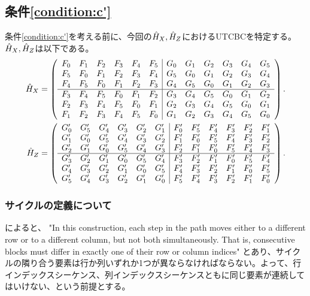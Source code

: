 \documentclass[a4paper,11pt,dvipdfmx]{jsarticle}
\theoremstyle{definition}
\begin{document}
\subsection{条件\ref{condition:c'}}
条件\ref{condition:c'}を考える前に、今回の$\hat{H}_X,\hat{H}_Z$におけるUTCBCを特定する。
$\hat{H}_X,\hat{H}_Z$は以下である。
\begin{align}
  \hat{H}_X &= \left( \begin{array}{cccccc|cccccc}
  F_0 & F_1 & F_2 & F_3 & F_4 & F_5 & G_0 & G_1 & G_2 & G_3 & G_4 & G_5 \\
  F_5 & F_0 & F_1 & F_2 & F_3 & F_4 & G_5 & G_0 & G_1 & G_2 & G_3 & G_4 \\
  F_4 & F_5 & F_0 & F_1 & F_2 & F_3 & G_4 & G_5 & G_0 & G_1 & G_2 & G_3 \\ \hline
  F_3 & F_4 & F_5 & F_0 & F_1 & F_2 & G_3 & G_4 & G_5 & G_0 & G_1 & G_2 \\
  F_2 & F_3 & F_4 & F_5 & F_0 & F_1 & G_2 & G_3 & G_4 & G_5 & G_0 & G_1 \\
  F_1 & F_2 & F_3 & F_4 & F_5 & F_0 & G_1 & G_2 & G_3 & G_4 & G_5 & G_0
  \end{array} \right).\\
  \hat{H}_Z &= \left( \begin{array}{cccccc|cccccc}
  G'_0 & G'_5 & G'_4 & G'_3 & G'_2 & G'_1 & F'_0 & F'_5 & F'_4 & F'_3 & F'_2 & F'_1 \\
  G'_1 & G'_0 & G'_5 & G'_4 & G'_3 & G'_2 & F'_1 & F'_0 & F'_5 & F'_4 & F'_3 & F'_2 \\
  G'_2 & G'_1 & G'_0 & G'_5 & G'_4 & G'_3 & F'_2 & F'_1 & F'_0 & F'_5 & F'_4 & F'_3 \\ \hline
  G'_3 & G'_2 & G'_1 & G'_0 & G'_5 & G'_4 & F'_3 & F'_2 & F'_1 & F'_0 & F'_5 & F'_4 \\
  G'_4 & G'_3 & G'_2 & G'_1 & G'_0 & G'_5 & F'_4 & F'_3 & F'_2 & F'_1 & F'_0 & F'_5 \\
  G'_5 & G'_4 & G'_3 & G'_2 & G'_1 & G'_0 & F'_5 & F'_4 & F'_3 & F'_2 & F'_1 & F'_0
  \end{array} \right).
\end{align}

\subsubsection{サイクルの定義について}
\cite{kasai2025quantum}によると、
"In this construction, each step in the path moves either to a different row or to a different column, but not both simultaneously. That is, consecutive blocks must differ in exactly one of their row or column indices"
とあり、サイクルの隣り合う要素は行か列いずれか1つが異ならなければならない。よって、行インデックスシーケンス、列インデックスシーケンスともに同じ要素が連続してはいけない、という前提とする。
\end{document}
